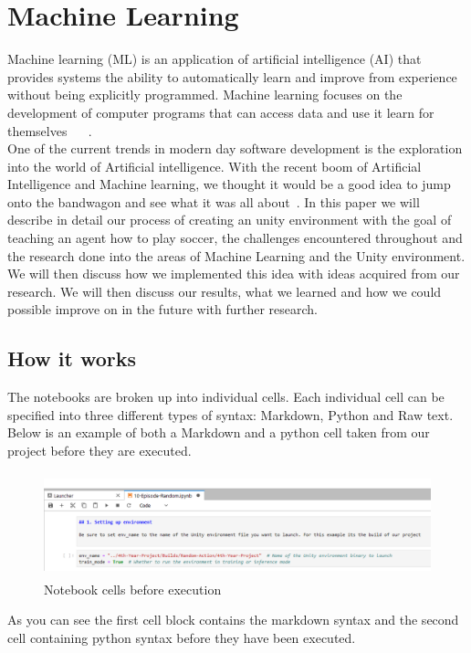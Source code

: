 \section{Machine Learning}
Machine learning (ML) is an application of artificial intelligence (AI) that provides systems the ability to automatically learn and improve from experience without being explicitly programmed. Machine learning focuses on the development of computer programs that can access data and use it learn for themselves ~\cite{pedregosa2011scikit} ~\cite{hornik2009open}.
\\
One of the current trends in modern day software development is the exploration into the world of Artificial intelligence.
With the recent boom of Artificial Intelligence and Machine learning, we thought it would be a good idea to jump onto the bandwagon and see what it was all about~\cite{geron2017hands}.
In this paper we will describe in detail our process of creating an unity environment with the goal of teaching an agent how to play soccer, the challenges encountered throughout and the research done into the areas of Machine Learning and the Unity environment.  We will then discuss how we implemented this idea with ideas acquired from our research. We will then discuss our results, what we learned and how we could possible improve on in the future with further research.
\\
\subsection{How it works}
The notebooks are broken up into individual cells. Each individual cell can be specified into three different types of syntax: Markdown, Python and Raw text. Below is an example of both a Markdown and a python cell taken from our project before they are executed.

\begin{figure}[H]
    \centering
    \includegraphics[width=115mm, height=30mm]{img/Notebook1.PNG}
    \caption{Notebook cells before execution}
    \label{fig:sd4}
\end{figure}

\begin{flushleft}
As you can see the first cell block contains the markdown syntax and the second cell containing python syntax before they have been executed.
\end{flushleft}


